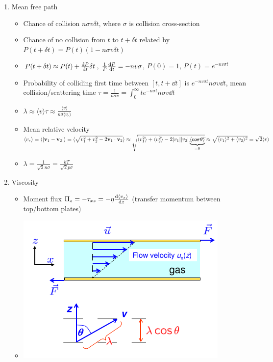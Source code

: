 \documentclass{article}
\theoremstyle{remark}
\begin{document}
\begin{enumerate}
    \item Mean free path\begin{itemize}
            \item Chance of collision $n\sigma v\delta t$, where $\sigma$ is collision cross-section
            \item Chance of no collision from $t$ to $t+\delta t$ related by $P(t+\delta t)=P(t)(1-n\sigma v\delta t)$
            \item $P(t+\delta t)\approx P(t)+\dv{P}{t}\delta t$, $\frac{1}{P}\dv{P}{t}=-nv\sigma$, $P(0)=1$, $\boxed{P(t)=e^{-nv\sigma t}}$
            \item Probability of colliding first time between $[t,t+\dd t]$ is $e^{-nv\sigma t}n\sigma v\dd t$, mean collision/scattering time $\boxed{\tau=\frac{1}{n\sigma v}}=\int_0^\infty te^{-n\sigma t}n\sigma v\dd t$
            \item $\lambda \approx \langle v\rangle\tau \approx \frac{\langle v\rangle}{n\sigma\langle v_r\rangle}$
            \item Mean relative velocity $\langle v_r\rangle = \langle |\vb{v}_1-\vb{v}_2|\rangle = \langle \sqrt{v_1^2+v_2^2-2\vb{v}_1\cdot \vb{v}_2}\rangle\\
                    \approx \sqrt{\langle v_1^2\rangle+\langle v_2^2\rangle-2|v_1||v_2|\underbrace{\cancel{\langle\cos\theta\rangle}}_{=0}}\approx \sqrt{\langle v_1\rangle^2+\langle v_2\rangle^2} = \sqrt{2}\langle v\rangle$
            \item $\boxed{\lambda=\frac{1}{\sqrt{2}n\sigma}=\frac{kT}{\sqrt{2}p\sigma}}$
        \end{itemize}
    \item Viscosity\begin{itemize}
            \item Moment flux $\Pi_z = -\tau_{xz} = -\eta\dv{\langle v_x\rangle}{z}$ (transfer momentum between top/bottom plates)
            \item \includegraphics*[width=0.5\linewidth]{viscosity_momentum_transport.png}\\

\end{itemize}
\end{enumerate}
\end{document}
